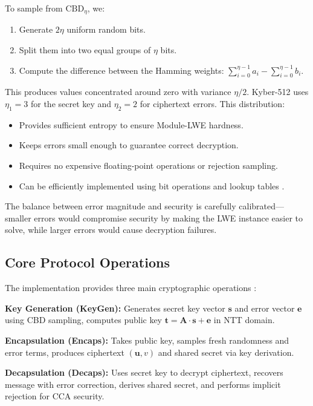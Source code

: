 To sample from $\text{CBD}_\eta$, we:
\begin{enumerate}
    \item Generate $2\eta$ uniform random bits.
    \item Split them into two equal groups of $\eta$ bits.
    \item Compute the difference between the Hamming weights: $\sum_{i=0}^{\eta-1} a_i - \sum_{i=0}^{\eta-1} b_i$.
\end{enumerate}

This produces values concentrated around zero with variance $\eta/2$. Kyber-512 uses $\eta_1 = 3$ for the secret key and $\eta_2 = 2$ for ciphertext errors. This distribution:
\begin{itemize}
    \item Provides sufficient entropy to ensure Module-LWE hardness.
    \item Keeps errors small enough to guarantee correct decryption.
    \item Requires no expensive floating-point operations or rejection sampling.
    \item Can be efficiently implemented using bit operations and lookup tables \cite{Kyber-Spec}.
\end{itemize}

The balance between error magnitude and security is carefully calibrated—smaller errors would compromise security by making the LWE instance easier to solve, while larger errors would cause decryption failures.

\subsection{Core Protocol Operations}

The implementation provides three main cryptographic operations \cite{Kyber-Spec}:

\textbf{Key Generation (KeyGen):} Generates secret key vector $\mathbf{s}$ and error vector $\mathbf{e}$ using CBD sampling, computes public key $\mathbf{t} = \mathbf{A} \cdot \mathbf{s} + \mathbf{e}$ in NTT domain.

\textbf{Encapsulation (Encaps):} Takes public key, samples fresh randomness and error terms, produces ciphertext $(\mathbf{u}, v)$ and shared secret via key derivation.

\textbf{Decapsulation (Decaps):} Uses secret key to decrypt ciphertext, recovers message with error correction, derives shared secret, and performs implicit rejection for CCA security.

